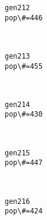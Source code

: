 \documentclass[11pt]{article}
\begin{document}
    \begin{Verbatim}[commandchars=\\\{\}]
gen212
pop\#=446

    \end{Verbatim}

    \begin{center}
    \end{center}
    { \hspace*{\fill} \\}
    
    \begin{Verbatim}[commandchars=\\\{\}]
gen213
pop\#=455

    \end{Verbatim}

    \begin{center}
    \end{center}
    { \hspace*{\fill} \\}
    
    \begin{Verbatim}[commandchars=\\\{\}]
gen214
pop\#=430

    \end{Verbatim}

    \begin{center}
    \end{center}
    { \hspace*{\fill} \\}
    
    \begin{Verbatim}[commandchars=\\\{\}]
gen215
pop\#=447

    \end{Verbatim}

    \begin{center}
    \end{center}
    { \hspace*{\fill} \\}
    
    \begin{Verbatim}[commandchars=\\\{\}]
gen216
pop\#=424

    \end{Verbatim}
\end{document}
